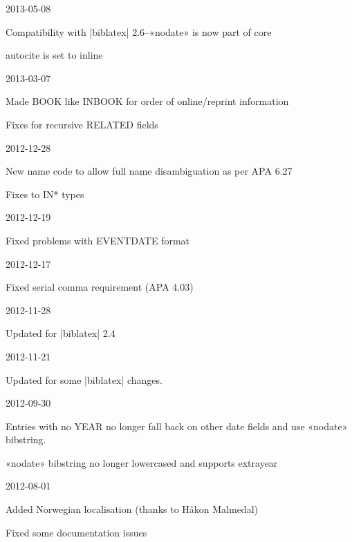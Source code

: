 \documentclass{ltxdockit}
\begin{document}
\begin{changelog}
\begin{release}{5.9}{2013-05-08}
\item Compatibility with |biblatex| 2.6--«nodate» is now part of core
\item autocite is set to inline
\end{release}

\begin{release}{5.8}{2013-03-07}
\item Made BOOK like INBOOK for order of online/reprint information
\item Fixes for recursive RELATED fields
\end{release}

\begin{release}{5.7}{2012-12-28}
\item New name code to allow full name disambiguation as per APA 6.27
\item Fixes to IN* types
\end{release}

\begin{release}{5.6}{2012-12-19}
\item Fixed problems with EVENTDATE format
\end{release}

\begin{release}{5.5}{2012-12-17}
\item Fixed serial comma requirement (APA 4.03)
\end{release}

\begin{release}{5.4}{2012-11-28}
\item Updated for |biblatex| 2.4
\end{release}

\begin{release}{5.3}{2012-11-21}
\item Updated for some |biblatex| changes.
\end{release}

\begin{release}{5.2}{2012-09-30}
\item Entries with no YEAR no longer fall back on other date fields
  and use «nodate» bibstring.
\item «nodate» bibstring no longer lowercased and supports extrayear
\end{release}

\begin{release}{5.1}{2012-08-01}
\item Added Norwegian localisation (thanks to Håkon Malmedal)
\item Fixed some documentation issues
\end{release}


\end{changelog}
\end{document}
